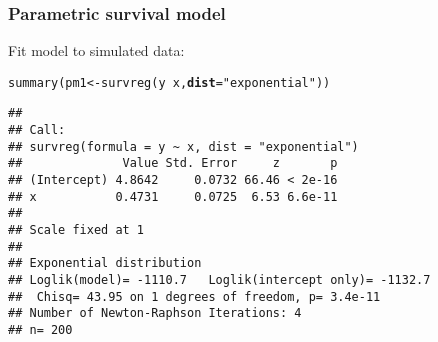 \documentclass[color=usenames,dvipsnames]{beamer}\usepackage[]{graphicx}\usepackage[]{color}
\makeatletter
\newcommand{\hlstr}[1]{\textcolor[rgb]{0.749,0.012,0.012}{#1}}%
\newcommand{\hlopt}[1]{\textcolor[rgb]{0,0,0}{#1}}%
\newcommand{\hlstd}[1]{\textcolor[rgb]{0,0,0}{#1}}%
\newcommand{\hlkwb}[1]{\textcolor[rgb]{0,0.341,0.682}{#1}}%
\newcommand{\hlkwc}[1]{\textcolor[rgb]{0,0,0}{\textbf{#1}}}%
\newcommand{\hlkwd}[1]{\textcolor[rgb]{0.004,0.004,0.506}{#1}}%
\newenvironment{kframe}{%
 \def\at@end@of@kframe{}%
 \ifinner\ifhmode%
  \def\at@end@of@kframe{\end{minipage}}%
  \begin{minipage}{\columnwidth}%
 \fi\fi%
 \def\FrameCommand##1{\hskip\@totalleftmargin \hskip-\fboxsep
 \colorbox{shadecolor}{##1}\hskip-\fboxsep
     \hskip-\linewidth \hskip-\@totalleftmargin \hskip\columnwidth}%
 \MakeFramed {\advance\hsize-\width
   \@totalleftmargin\z@ \linewidth\hsize
   \@setminipage}}%
 {\par\unskip\endMakeFramed%
 \at@end@of@kframe}
\newenvironment{knitrout}{}{} %
\makeatother
\begin{document}
\begin{frame}[fragile]
  \frametitle{Parametric survival model}
  Fit model to simulated data:
\begin{knitrout}\scriptsize
{}\color{fgcolor}\begin{kframe}
\begin{alltt}
\hlkwd{summary}\hlstd{(pm1} \hlkwb{<-} \hlkwd{survreg}\hlstd{(y} \hlopt{~} \hlstd{x,} \hlkwc{dist}\hlstd{=}\hlstr{"exponential"}\hlstd{))}
\end{alltt}
\begin{verbatim}
## 
## Call:
## survreg(formula = y ~ x, dist = "exponential")
##              Value Std. Error     z       p
## (Intercept) 4.8642     0.0732 66.46 < 2e-16
## x           0.4731     0.0725  6.53 6.6e-11
## 
## Scale fixed at 1 
## 
## Exponential distribution
## Loglik(model)= -1110.7   Loglik(intercept only)= -1132.7
## 	Chisq= 43.95 on 1 degrees of freedom, p= 3.4e-11 
## Number of Newton-Raphson Iterations: 4 
## n= 200
\end{verbatim}
\end{kframe}
\end{knitrout}
\end{frame}
\end{document}
